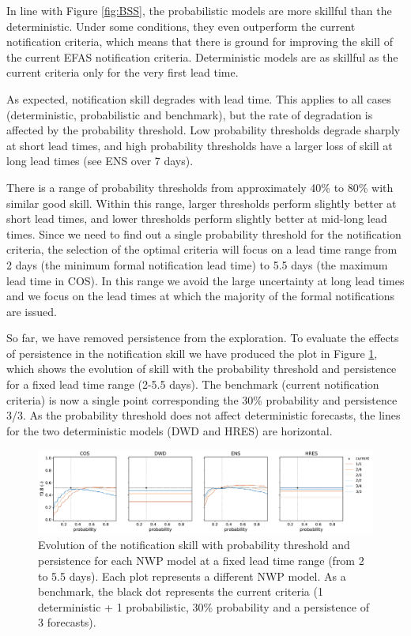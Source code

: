 \documentclass[preprint,12pt,authoryear]{elsarticle}
\begin{document}
In line with Figure \ref{fig:BSS}, the probabilistic models are more skillful than the deterministic. Under some conditions, they even outperform the current notification criteria, which means that there is ground for improving the skill of the current EFAS notification criteria. Deterministic models are as skillful as the current criteria only for the very first lead time.

As expected, notification skill degrades with lead time. This applies to all cases (deterministic, probabilistic and benchmark), but the rate of degradation is affected by the probability threshold. Low probability thresholds degrade sharply at short lead times, and high probability thresholds have a larger loss of skill at long lead times (see ENS over 7 days). 

There is a range of probability thresholds from approximately 40\% to 80\% with similar good skill. Within this range, larger thresholds perform slightly better at short lead times, and lower thresholds perform slightly better at mid-long lead times. Since we need to find out a single probability threshold for the notification criteria, the selection of the optimal criteria will focus on a lead time range from 2 days (the minimum formal notification lead time) to 5.5 days (the maximum lead time in COS). In this range we avoid the large uncertainty at long lead times and we focus on the lead times at which the majority of the formal notifications are issued.

So far, we have removed persistence from the exploration. To evaluate the effects of persistence in the notification skill we have produced the plot in Figure \ref{fig:NWP_skill_probability}, which shows the evolution of skill with the probability threshold and persistence for a fixed lead time range (2-5.5 days). The benchmark (current notification criteria) is now a single point corresponding the 30\% probability and persistence 3/3. As the probability threshold does not affect deterministic forecasts, the lines for the two deterministic models (DWD and HRES) are horizontal.

\begin{figure}
    \centering
    \includegraphics[width=1\textwidth]{figures/skill_persistence_probability_060h_NWP.pdf}
    \caption{Evolution of the notification skill with probability threshold and persistence  for each NWP model at a fixed lead time range (from 2 to 5.5 days). Each plot represents a different NWP model. As a benchmark, the black dot represents the current criteria (1 deterministic + 1 probabilistic, 30\% probability and a persistence of 3 forecasts).}
    \label{fig:NWP_skill_probability}
\end{figure}
\end{document}
